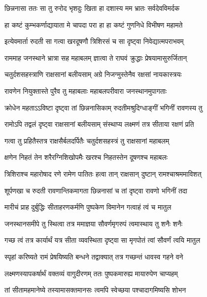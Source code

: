\twolineshloka
{छिन्ननासा ततः सा तु रुरोद भृशदुः खिता}
{हा दशास्य मम भ्रातः सर्वदेवविमर्दक} %

\twolineshloka
{हा कष्टं कुम्भकर्णाद्यायाता मे चापदा परा}
{हा हा कष्टं गुणनिधे विभीषण महामते} %

\twolineshloka
{इत्येवमार्ता रुदती सा गत्वा खरदूषणौ}
{त्रिशिरसं च सा दृष्ट्वा निवेद्यात्मपराभवम्} %

\twolineshloka
{राममाह जनस्थाने भ्रात्रा सह महाबलम्}
{ज्ञात्वा ते राघवं क्रुद्धाः प्रेषयामासुरुर्जितान्} %

\twolineshloka
{चतुर्दशसहस्त्राणि राक्षसानां बलीयसाम्}
{अग्रे निजग्मुस्तेनैव रक्षसां नायकास्त्रयः} %

\twolineshloka
{रावणेन नियुक्तास्ते पुरैव तु महाबलाः}
{महाबलपरीवारा जनस्थानमुपागताः} %

\twolineshloka
{क्रोधेन महताऽऽविष्टा दृष्ट्वा तां छिन्ननासिकाम्}
{रुदतीमश्रुदिग्धाङ्गीं भगिनीं रावणस्य तु} %

\twolineshloka
{रामोऽपि तद्वलं दृष्ट्वा राक्षसानां बलीयसाम्}
{संस्थाप्य लक्ष्मणं तत्र सीताया रक्षणं प्रति} %

\twolineshloka
{गत्वा तु प्रहितैस्तत्र राक्षसैर्बलदर्पितैः}
{चतुर्दशसहस्त्रं तु राक्षसानां महाबलम्} %

\twolineshloka
{क्षणेन निहतं तेन शरैरग्निशिखोपमैः}
{खरश्च निहतस्तेन दूषणश्च महाबलः} %

\twolineshloka
{त्रिशिराश्च महारोषाद रणे रामेण पातितः}
{हत्वा तान् राक्षसान् दुष्टान् रामश्चाश्रममाविशत्} %

\twolineshloka
{शूर्पणखा च रुदती रावणान्तिकमागता}
{छिन्ननासां च तां दृष्ट्वा रावणो भगिनीं तदा} %

\twolineshloka
{मारीचं प्राह दुर्बुद्धिः सीताहरणकर्मणि}
{पुष्पकेण विमानेन गत्वाहं त्वं च मातुल} %

\twolineshloka
{जनस्थानसमीपे तु स्थित्वा तत्र ममाज्ञया}
{सौवर्णमृगरुपं त्वमास्थाय तु शनैः शनैः} %

\twolineshloka
{गच्छ त्वं तत्र कार्यार्थं यत्र सीता व्यवस्थिता}
{दृष्ट्वा सा मृगपोतं त्वां सौवर्णं त्वयि मातुल} %

\twolineshloka
{स्पृहां करिष्यते रामं प्रेषयिष्यति बन्धने}
{तद्वाक्यात् तत्र गच्छन्तं धावस्व गहने वने} %

\twolineshloka
{लक्ष्मणस्यापकर्षार्थं वक्तव्यं वागुदीरणम्}
{ततः पुष्पकमारुह्य मायारुपेण चाप्यहम्} %

\twolineshloka
{तां सीतामहमानेष्ये तस्यामासक्तमानसः}
{त्वमपि स्वेच्छया पश्चादागमिष्यसि शोभन} %

